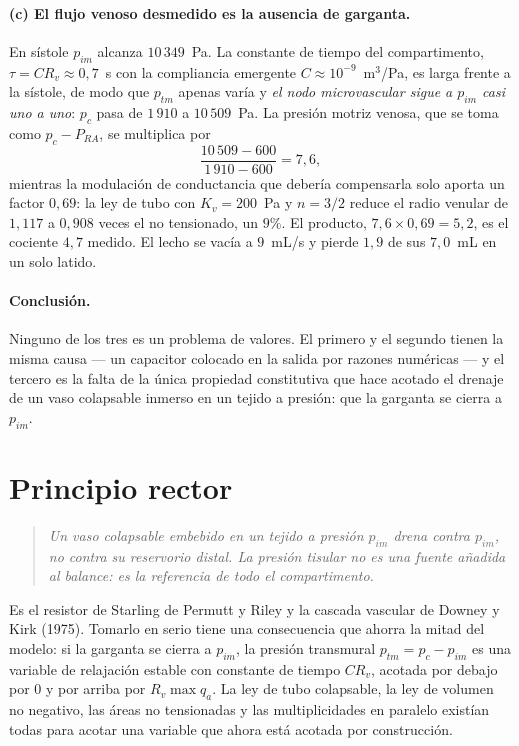 \documentclass[11pt]{article}
\begin{document}
\paragraph{(c) El flujo venoso desmedido es la ausencia de garganta.} En
s\'istole $p_{im}$ alcanza $10\,349$~Pa. La constante de tiempo del
compartimento, $\tau=C R_v\approx0{,}7$~s con la compliancia emergente
$C\approx10^{-9}$~m$^3$/Pa, es larga frente a la s\'istole, de modo que $p_{tm}$
apenas var\'ia y \emph{el nodo microvascular sigue a $p_{im}$ casi uno a uno}:
$p_c$ pasa de $1\,910$ a $10\,509$~Pa. La presi\'on motriz venosa, que se toma
como $p_c-P_{RA}$, se multiplica por
\[
  \frac{10\,509-600}{1\,910-600}=7{,}6 ,
\]
mientras la modulaci\'on de conductancia que deber\'ia compensarla solo aporta
un factor $0{,}69$: la ley de tubo con $K_v=200$~Pa y $n=3/2$ reduce el radio
venular de $1{,}117$ a $0{,}908$ veces el no tensionado, un $9\%$. El producto,
$7{,}6\times0{,}69=5{,}2$, es el cociente $4{,}7$ medido. El lecho se vac\'ia a
$9$~mL/s y pierde $1{,}9$ de sus $7{,}0$~mL en un solo latido.

\paragraph{Conclusi\'on.} Ninguno de los tres es un problema de valores. El
primero y el segundo tienen la misma causa --- un capacitor colocado en la
salida por razones num\'ericas --- y el tercero es la falta de la \'unica
propiedad constitutiva que hace acotado el drenaje de un vaso colapsable
inmerso en un tejido a presi\'on: que la garganta se cierra a $p_{im}$.

\section{Principio rector}

\begin{quote}
\emph{Un vaso colapsable embebido en un tejido a presi\'on $p_{im}$ drena
contra $p_{im}$, no contra su reservorio distal. La presi\'on tisular no es una
fuente a\~nadida al balance: es la referencia de todo el compartimento.}
\end{quote}

\noindent
Es el resistor de Starling de Permutt y Riley y la cascada vascular de
Downey y Kirk (1975). Tomarlo en serio tiene una consecuencia que ahorra la
mitad del modelo: si la garganta se cierra a $p_{im}$, la presi\'on transmural
$p_{tm}=p_c-p_{im}$ es una variable de relajaci\'on estable con constante de
tiempo $CR_v$, acotada por debajo por $0$ y por arriba por $R_v\max q_a$. La
ley de tubo colapsable, la ley de volumen no negativo, las \'areas no
tensionadas y las multiplicidades en paralelo exist\'ian todas para acotar una
variable que ahora est\'a acotada por construcci\'on.
\end{document}
